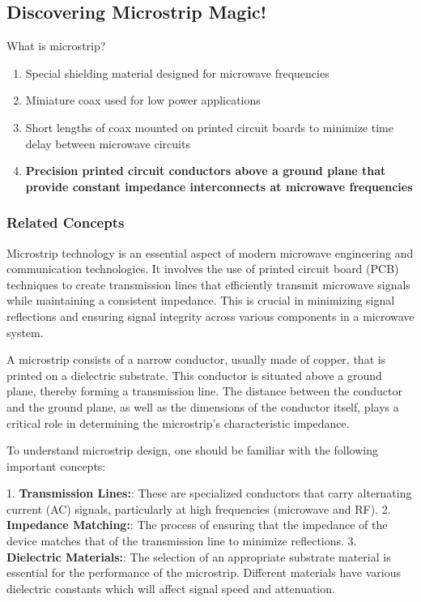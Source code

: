 \subsection{Discovering Microstrip Magic!}

\begin{tcolorbox}[colback=gray!10, colframe=black, title=E9F05] 

What is microstrip? 

\begin{enumerate}[label=\Alph*]
    \item Special shielding material designed for microwave frequencies
    \item Miniature coax used for low power applications
    \item Short lengths of coax mounted on printed circuit boards to minimize time delay between microwave circuits
    \item \textbf{Precision printed circuit conductors above a ground plane that provide constant impedance interconnects at microwave frequencies}
\end{enumerate} \end{tcolorbox}

\subsubsection{Related Concepts}

Microstrip technology is an essential aspect of modern microwave engineering and communication technologies. It involves the use of printed circuit board (PCB) techniques to create transmission lines that efficiently transmit microwave signals while maintaining a consistent impedance. This is crucial in minimizing signal reflections and ensuring signal integrity across various components in a microwave system.

A microstrip consists of a narrow conductor, usually made of copper, that is printed on a dielectric substrate. This conductor is situated above a ground plane, thereby forming a transmission line. The distance between the conductor and the ground plane, as well as the dimensions of the conductor itself, plays a critical role in determining the microstrip's characteristic impedance.

To understand microstrip design, one should be familiar with the following important concepts:

1. \textbf{Transmission Lines:}: These are specialized conductors that carry alternating current (AC) signals, particularly at high frequencies (microwave and RF).
2. \textbf{Impedance Matching:}: The process of ensuring that the impedance of the device matches that of the transmission line to minimize reflections.
3. \textbf{Dielectric Materials:}: The selection of an appropriate substrate material is essential for the performance of the microstrip. Different materials have various dielectric constants which will affect signal speed and attenuation.

